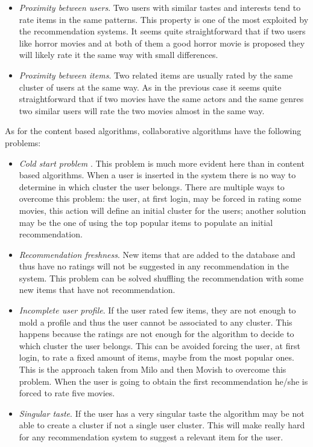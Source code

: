 \begin{itemize}
\begin{itemize}
\item \textit{Proximity between users}. Two users with similar tastes and interests tend to rate items in the same patterns. This property is one of the most exploited by the recommendation systems. It seems quite straightforward that if two users like horror movies and at both of them a good horror movie is proposed they will likely rate it the same way with small differences.
\item \textit{Proximity between items}. Two related items are usually rated by the same cluster of users at the same way. As in the previous case it seems quite straightforward that if two movies have the same actors and the same genres two similar users will rate the two movies almost in the same way.
\end{itemize}

As for the content based algorithms, collaborative algorithms have the following problems:

\begin{itemize}
\item \textit{Cold start problem} \cite{cold-start-recommendations}. This problem is much more evident here than in content based algorithms. When a user is inserted in the system there is no way to determine in which cluster the user belongs. There are multiple ways to overcome this problem: the user, at first login, may be forced in rating some movies, this action will define an initial cluster for the users; another solution may be the one of using the top popular items to populate an initial recommendation.
\item \textit{Recommendation freshness}. New items that are added to the database and thus have no ratings will not be suggested in any recommendation in the system. This problem can be solved shuffling the recommendation with some new items that have not recommendation.
\item \textit{Incomplete user profile}. If the user rated few items, they are not enough to mold a profile and thus the user cannot be associated to any cluster. This happens because the ratings are not enough for the algorithm to decide to which cluster the user belongs. This can be avoided forcing the user, at first login, to rate a fixed amount of items, maybe from the most popular ones. This is the approach taken from Milo and then Movish to overcome this problem. When the user is going to obtain the first recommendation he/she is forced to rate five movies.
\item \textit{Singular taste}. If the user has a very singular taste the algorithm may be not able to create a cluster if not a single user cluster. This will make really hard for any recommendation system to suggest a relevant item for the user.
\end{itemize}
\end{itemize}

